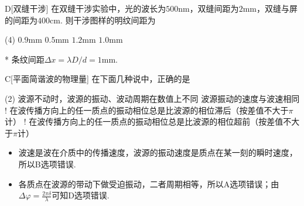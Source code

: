 \begin{choice}{D}[双缝干涉]
    在双缝干涉实验中，光的波长为$500\mathrm{nm}$，双缝间距为$2\mathrm{mm}$，双缝与屏的间距为$400\mathrm{cm}$. 则干涉图样的明纹间距为
    \begin{tasks}(4)
        \task $0.9\mathrm{mm}$
        \task $0.5\mathrm{mm}$
        \task $1.2\mathrm{mm}$
        \task $1.0\mathrm{mm}$
    \end{tasks}
\end{choice}
\begin{solution}*
    条纹间距$\Delta x=\lambda D/d=1\mathrm{mm}$.
\end{solution}

\begin{choice}{C}[平面简谐波的物理量]
    在下面几种说中，正确的是
    \begin{tasks}(2)
        \task 波源不动时，波源的振动、波动周期在数值上不同
        \task 波源振动的速度与波速相同
        \task! 在波传播方向上的任一质点的振动相位总是比波源的相位滞后（按差值不大于$\pi$计）
        \task! 在波传播方向上的任一质点的振动相位总是比波源的相位超前（按差值不大于$\pi$计）
    \end{tasks}
\end{choice}
\begin{solution}
    \begin{itemize}
        \item 波速是波在介质中的传播速度，波源的振动速度是质点在某一刻的瞬时速度，所以B选项错误.
        \item 各质点在波源的带动下做受迫振动，二者周期相等，所以A选项错误；由$\Delta\varphi=\frac{2\pi\delta}{\lambda}$可知D选项错误.
    \end{itemize}
\end{solution}

